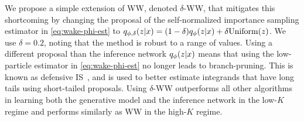 We propose a simple extension of \gls{WW}, denoted $\delta$-\acrshort{WW}, that mitigates this shortcoming by changing the proposal of the self-normalized importance sampling estimator in \cref{eq:wake-phi-est} to \(q_{\phi, \delta}(z \lvert x) = (1 - \delta) q_\phi(z \lvert x) + \delta \mathrm{Uniform}(z)\).
We use $\delta = 0.2$, noting that the method is robust to a range of values.
Using a different proposal than the inference network $q_\phi(z \lvert x)$ means that using the low-particle estimator in \cref{eq:wake-phi-est} no longer leads to branch-pruning.
This is known as defensive \acrlong{IS}~\citep{Hesterberg1995weighted}, and is used to better estimate integrands that have long tails using short-tailed proposals.
Using $\delta$-\gls{WW} outperforms all other algorithms in learning both the generative model and the inference network in the low-$K$ regime and performs similarly as \gls{WW} in the high-$K$ regime.


